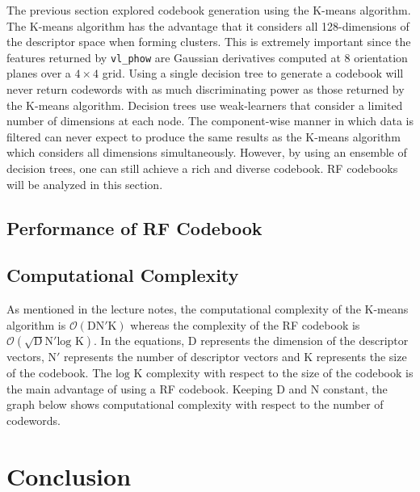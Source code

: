 \documentclass[a4paper,pra,twocolumn,10pt,aps,longbibliography,nobalancelastpage]{revtex4-1}
\begin{document}
The previous section explored codebook generation using the K-means algorithm. The K-means algorithm has the advantage that it considers all 128-dimensions of the descriptor space when forming clusters. This is extremely important since the features returned by \texttt{vl\_phow} are Gaussian derivatives computed at 8 orientation planes over a $4\times 4$ grid. Using a single decision tree to generate a codebook will never return codewords with as much discriminating power as those returned by the K-means algorithm. Decision trees use weak-learners that consider a limited number of dimensions at each node. The component-wise manner in which data is filtered can never expect to produce the same results as the K-means algorithm which considers all dimensions simultaneously. However, by using an ensemble of decision trees, one can still achieve a rich and diverse codebook. RF codebooks will be analyzed in this section.

\subsection{Performance of RF Codebook}



\subsection{Computational Complexity}

As mentioned in the lecture notes, the computational complexity of the K-means algorithm is $\mathcal{O}(\text{DN}'\text{K})$ whereas the complexity of the RF codebook is $\mathcal{O}(\sqrt{\text{D}}\text{N}'\text{log K})$. In the equations, $\text{D}$ represents the dimension of the descriptor vectors, $\text{N}'$ represents the number of descriptor vectors and $\text{K}$ represents the size of the codebook. The $\text{log \ K}$ complexity with respect to the size of the codebook is the main advantage of using a RF codebook. Keeping D and N constant, the graph below shows computational complexity with respect to the number of codewords.


\section{Conclusion}
\end{document}
